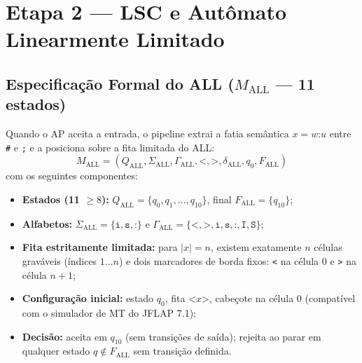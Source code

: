 \section{Etapa 2 --- LSC e Autômato Linearmente Limitado}

\subsection{Especificação Formal do ALL ($M_{\text{ALL}}$ --- 11 estados)}

Quando o AP aceita a entrada, o pipeline extrai a fatia semântica $x = w\texttt{:}u$ entre \texttt{\#} e \texttt{;} e a posiciona sobre a fita limitada do ALL:
\[
M_{\text{ALL}} = (Q_{\text{ALL}}, \Sigma_{\text{ALL}}, \Gamma_{\text{ALL}}, \texttt{<}, \texttt{>}, \delta_{\text{ALL}}, q_0, F_{\text{ALL}})
\]
com os seguintes componentes:
\begin{itemize}
    \item \textbf{Estados (11 $\ge 8$):} $Q_{\text{ALL}} = \{q_0, q_1, \dots, q_{10}\}$, final $F_{\text{ALL}} = \{q_{10}\}$;
    \item \textbf{Alfabetos:} $\Sigma_{\text{ALL}} = \{\texttt{i}, \texttt{s}, \texttt{:}\}$ e $\Gamma_{\text{ALL}} = \{\texttt{<}, \texttt{>}, \texttt{i}, \texttt{s}, \texttt{:}, \texttt{I}, \texttt{S}\}$;
    \item \textbf{Fita estritamente limitada:} para $|x| = n$, existem exatamente $n$ células graváveis (índices $1 \dots n$) e dois marcadores de borda fixos: \texttt{<} na célula $0$ e \texttt{>} na célula $n+1$;
    \item \textbf{Configuração inicial:} estado $q_0$, fita $\texttt{<}x\texttt{>}$, cabeçote na célula $0$ (compatível com o simulador de MT do JFLAP 7.1);
    \item \textbf{Decisão:} aceita em $q_{10}$ (sem transições de saída); rejeita ao parar em qualquer estado $q \notin F_{\text{ALL}}$ sem transição definida.
\end{itemize}

